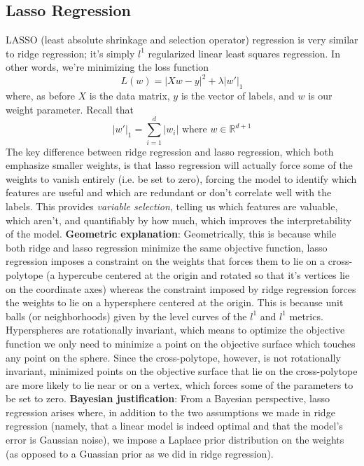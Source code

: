 \documentclass{article}
\begin{document}
\subsection{Lasso Regression}
LASSO (least absolute shrinkage and selection operator) regression is very similar to ridge regression; it's simply $ l^1 $ regularized linear least squares regression. In other words, we're minimizing the loss function
$$ L(w) = | X w - y |^2 + \lambda | w' |_1 $$
where, as before $ X $ is the data matrix, $ y $ is the vector of labels, and $ w $ is our weight parameter. Recall that
$$ | w' |_1 = \sum_{i = 1}^d | w_i | \text{ where } w \in \mathbb{R}^{d + 1} $$
The key difference between ridge regression and lasso regression, which both emphasize smaller weights, is that lasso regression will actually force some of the weights to vanish entirely (i.e. be set to zero), forcing the model to identify which features are useful and which are redundant or don't correlate well with the labels. This provides \textit{variable selection}, telling us which features are valuable, which aren't, and quantifiably by how much, which improves the interpretability of the model. 
\newline \newline
\textbf{Geometric explanation}: Geometrically, this is because while both ridge and lasso regression minimize the same objective function, lasso regression imposes a constraint on the weights that forces them to lie on a cross-polytope (a hypercube centered at the origin and rotated so that it's vertices lie on the coordinate axes) whereas the constraint imposed by ridge regression forces the weights to lie on a hypersphere centered at the origin. This is because unit balls (or neighborhoods) given by the level curves of the $ l^1 $ and $ l^1 $ metrics. Hyperspheres are rotationally invariant, which means to optimize the objective function we only need to minimize a point on the objective surface which touches any point on the sphere. Since the cross-polytope, however, is not rotationally invariant, minimized points on the objective surface that lie on the cross-polytope are more likely to lie near or on a vertex, which forces some of the parameters to be set to zero.
\newline \newline
\textbf{Bayesian justification}: From a Bayesian perspective, lasso regression arises where, in addition to the two assumptions we made in ridge regression (namely, that a linear model is indeed optimal and that the model's error is Gaussian noise), we impose a Laplace prior distribution on the weights (as opposed to a Guassian prior as we did in ridge regression).
\end{document}
